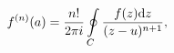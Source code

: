 \begin{equation}
f^{(n)}(a) = \frac{n!}{2 \pi i} \oint\limits_{C}
\frac{f(z){\rm d} z}{(z-u)^{n+1}},
\end{equation}

